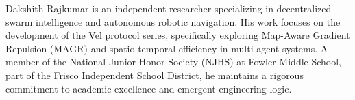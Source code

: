 \documentclass[journal,compsoc]{IEEEtran}
\begin{document}
\begin{IEEEbiographynophoto}{Dakshith Rajkumar}
is an independent researcher specializing in decentralized swarm intelligence and autonomous robotic navigation. His work focuses on the development of the Vel protocol series, specifically exploring Map-Aware Gradient Repulsion (MAGR) and spatio-temporal efficiency in multi-agent systems. A member of the National Junior Honor Society (NJHS) at Fowler Middle School, part of the Frisco Independent School District, he maintains a rigorous commitment to academic excellence and emergent engineering logic.
\end{IEEEbiographynophoto}

\vfill %
\end{document}
